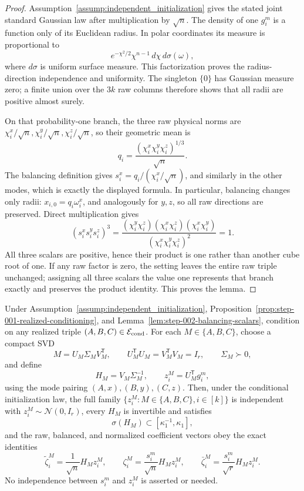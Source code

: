\begin{proof}
Assumption~\ref{assump:independent_initialization}
gives the stated joint standard Gaussian law after multiplication by
\(\sqrt n\). The density of one \(g_i^m\) is a function only of its Euclidean
radius. In polar coordinates its measure is proportional to
\[
  e^{-\chi^2/2}\chi^{n-1}\,d\chi\,d\sigma(\omega),
\]
where \(d\sigma\) is uniform surface measure. This factorization proves the
radius-direction independence and uniformity. The singleton \(\{0\}\) has
Gaussian measure zero; a finite union over the \(3k\) raw columns therefore
shows that all radii are positive almost surely.

On that probability-one branch, the three raw physical norms are
\(\chi_i^x/\sqrt n,\chi_i^y/\sqrt n,\chi_i^z/\sqrt n\), so their geometric
mean is
\[
  q_i=\frac{(\chi_i^x\chi_i^y\chi_i^z)^{1/3}}{\sqrt n}.
\]
The balancing definition gives
\(s_i^x=q_i/(\chi_i^x/\sqrt n)\), and similarly in the other modes, which is
exactly the displayed formula. In particular, balancing changes only radii:
\(x_{i,0}=q_i\omega_i^x\), and analogously for \(y,z\), so all raw directions
are preserved. Direct multiplication gives
\[
  (s_i^x s_i^y s_i^z)^3
  =\frac{(\chi_i^y\chi_i^z)(\chi_i^x\chi_i^z)
          (\chi_i^x\chi_i^y)}
         {(\chi_i^x\chi_i^y\chi_i^z)^2}
  =1.
\]
All three scalars are positive, hence their product is one rather than another
cube root of one. If any raw factor is zero, the setting leaves the entire raw
triple unchanged; assigning all three scalars the value one represents that
branch exactly and preserves the product identity. This proves the lemma.


\end{proof}


\begin{lemma}
\label{lem:step-002-coefficient-gaussianization}
Under Assumption~\ref{assump:independent_initialization}, Proposition~\ref{prop:step-001-realized-conditioning}, and
Lemma~\ref{lem:step-002-balancing-scalars}, condition on any realized triple
\((A,B,C)\in\mathcal E_{\rm cond}\). For each
\(M\in\{A,B,C\}\), choose a compact SVD
\[
  M=U_M\Sigma_MV_M^{\mathsf T},
  \qquad U_M^{\mathsf T}U_M=V_M^{\mathsf T}V_M=I_r,
  \qquad \Sigma_M\succ0,
\]
and define
\[
  H_M=V_M\Sigma_M^{-1},
  \qquad z_i^M=U_M^{\mathsf T}g_i^m,
\]
using the mode pairing \((A,x),(B,y),(C,z)\). Then, under the conditional
initialization law, the full family
\(\{z_i^M:M\in\{A,B,C\},i\in[k]\}\) is independent with
\(z_i^M\sim\mathcal N(0,I_r)\), every \(H_M\) is invertible and satisfies
\[
  \sigma(H_M)\subset[\kappa_1^{-1},\kappa_1],
\]
and the raw, balanced, and normalized coefficient vectors obey the exact
identities
\[
  \widetilde\zeta_i^M=\frac1{\sqrt n}H_Mz_i^M,
  \qquad
  \zeta_i^M=\frac{s_i^m}{\sqrt n}H_Mz_i^M,
  \qquad
  \boxed{\bar\zeta_i^M=\frac{s_i^m}{\sqrt r}H_Mz_i^M}.
\]
No independence between \(s_i^m\) and \(z_i^M\) is asserted or needed.

\end{lemma}

